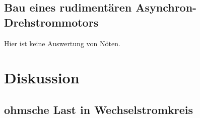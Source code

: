 \documentclass[12pt,english,ngerman]{scrartcl}
\begin{document}

\subsection{Bau eines rudimentären Asynchron-Drehstrommotors}

Hier ist keine Auswertung von Nöten.

\section{Diskussion}\label{sec:diskussion}

\subsection{ohmsche Last in Wechselstromkreis}
\end{document}
